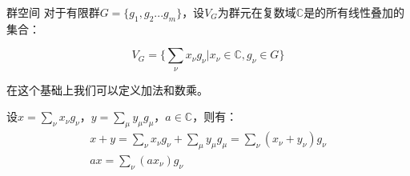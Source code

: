 \begin{issues}
\issueDraft
\end{issues}

\begin{definition}{群空间}
对于有限群$G=\{g_1,g_2...g_m\}$，设$V_G$为群元在复数域$\mathbb{C}$是的所有线性叠加的集合：

\begin{equation}
V_G=\{\displaystyle\sum_\nu x_\nu g_\nu|x_\nu \in \mathbb{C},g_\nu \in G\}
\end{equation}

在这个基础上我们可以定义加法和数乘。

设$x=\displaystyle\sum_\nu x_\nu g_\nu$，$y=\displaystyle\sum_\mu y_\mu g_\mu$，$a\in \mathbb{C}$，则有：
\begin{gather}
x+y=\displaystyle\sum_\nu x_\nu g_\nu+\displaystyle\sum_\mu y_\mu g_\mu=\displaystyle\sum_\nu(x_\nu+y_\nu)g_\nu\\
ax=\displaystyle\sum_\nu (ax_\nu) g_\nu
\end{gather}



\end{definition}